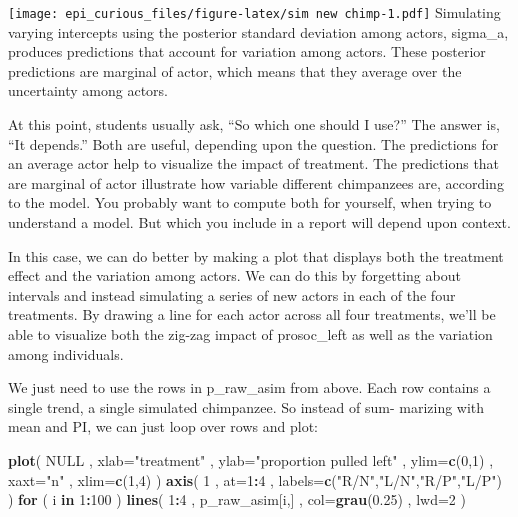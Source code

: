 \documentclass[
]{article}
\newenvironment{Shaded}{\begin{snugshade}}{\end{snugshade}}
\newcommand{\ControlFlowTok}[1]{\textcolor[rgb]{0.13,0.29,0.53}{\textbf{#1}}}
\newcommand{\DataTypeTok}[1]{\textcolor[rgb]{0.13,0.29,0.53}{#1}}
\newcommand{\DecValTok}[1]{\textcolor[rgb]{0.00,0.00,0.81}{#1}}
\newcommand{\FloatTok}[1]{\textcolor[rgb]{0.00,0.00,0.81}{#1}}
\newcommand{\KeywordTok}[1]{\textcolor[rgb]{0.13,0.29,0.53}{\textbf{#1}}}
\newcommand{\NormalTok}[1]{#1}
\newcommand{\OperatorTok}[1]{\textcolor[rgb]{0.81,0.36,0.00}{\textbf{#1}}}
\newcommand{\OtherTok}[1]{\textcolor[rgb]{0.56,0.35,0.01}{#1}}
\newcommand{\StringTok}[1]{\textcolor[rgb]{0.31,0.60,0.02}{#1}}
\begin{document}
\texttt{[image: epi\_curious\_files/figure-latex/sim new chimp-1.pdf]}
Simulating varying intercepts using the posterior standard deviation
among actors, sigma\_a, produces predictions that account for variation
among actors. These posterior predictions are marginal of actor, which
means that they average over the uncertainty among actors.

At this point, students usually ask, ``So which one should I use?'' The
answer is, ``It depends.'' Both are useful, depending upon the question.
The predictions for an average actor help to visualize the impact of
treatment. The predictions that are marginal of actor illustrate how
variable different chimpanzees are, according to the model. You probably
want to compute both for yourself, when trying to understand a model.
But which you include in a report will depend upon context.

In this case, we can do better by making a plot that displays both the
treatment effect and the variation among actors. We can do this by
forgetting about intervals and instead simulating a series of new actors
in each of the four treatments. By drawing a line for each actor across
all four treatments, we'll be able to visualize both the zig-zag impact
of prosoc\_left as well as the variation among individuals.

We just need to use the rows in p\_raw\_asim from above. Each row
contains a single trend, a single simulated chimpanzee. So instead of
sum- marizing with mean and PI, we can just loop over rows and plot:

\begin{Shaded}
\begin{Highlighting}[]
\KeywordTok{plot}\NormalTok{( }\OtherTok{NULL}\NormalTok{ , }\DataTypeTok{xlab=}\StringTok{"treatment"}\NormalTok{ , }\DataTypeTok{ylab=}\StringTok{"proportion pulled left"}\NormalTok{ ,}
    \DataTypeTok{ylim=}\KeywordTok{c}\NormalTok{(}\DecValTok{0}\NormalTok{,}\DecValTok{1}\NormalTok{) , }\DataTypeTok{xaxt=}\StringTok{"n"}\NormalTok{ , }\DataTypeTok{xlim=}\KeywordTok{c}\NormalTok{(}\DecValTok{1}\NormalTok{,}\DecValTok{4}\NormalTok{) )}
\KeywordTok{axis}\NormalTok{( }\DecValTok{1}\NormalTok{ , }\DataTypeTok{at=}\DecValTok{1}\OperatorTok{:}\DecValTok{4}\NormalTok{ , }\DataTypeTok{labels=}\KeywordTok{c}\NormalTok{(}\StringTok{"R/N"}\NormalTok{,}\StringTok{"L/N"}\NormalTok{,}\StringTok{"R/P"}\NormalTok{,}\StringTok{"L/P"}\NormalTok{) )}
\ControlFlowTok{for}\NormalTok{ ( i }\ControlFlowTok{in} \DecValTok{1}\OperatorTok{:}\DecValTok{100}\NormalTok{ ) }\KeywordTok{lines}\NormalTok{( }\DecValTok{1}\OperatorTok{:}\DecValTok{4}\NormalTok{ , p_raw_asim[i,] , }\DataTypeTok{col=}\KeywordTok{grau}\NormalTok{(}\FloatTok{0.25}\NormalTok{) , }\DataTypeTok{lwd=}\DecValTok{2}\NormalTok{ )}
\end{Highlighting}
\end{Shaded}
\end{document}
